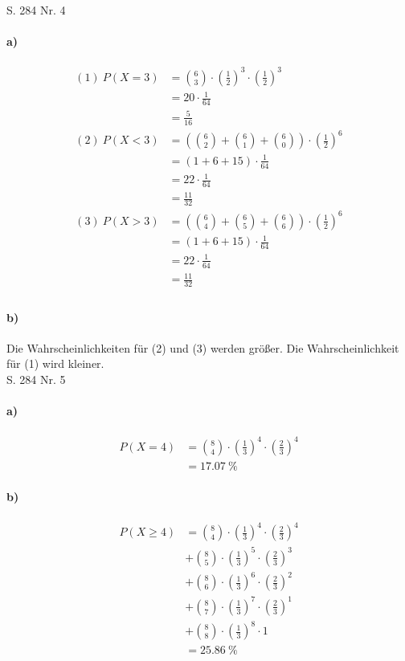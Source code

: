 \documentclass[12pt,a4paper]{report}
\begin{document}
	\noindent
	\Large
	S. 284 Nr. 4
	\large
	\paragraph{a)}
	\begin{align*}
		(1)\ P(X = 3) &= \binom{6}{3} \cdot (\frac{1}{2})^3 \cdot (\frac{1}{2})^3 \\
		&= 20 \cdot \frac{1}{64} \\
		&= \frac{5}{16} \\
		(2)\ P(X < 3) &= (\binom{6}{2} + \binom{6}{1} + \binom{6}{0}) \cdot (\frac{1}{2})^6 \\
		&= (1+6+15) \cdot \frac{1}{64} \\
		&= 22 \cdot \frac{1}{64} \\
		&= \frac{11}{32} \\
		(3)\ P(X > 3) &= (\binom{6}{4} + \binom{6}{5} + \binom{6}{6}) \cdot (\frac{1}{2})^6 \\
		&= (1+6+15) \cdot \frac{1}{64} \\
		&= 22 \cdot \frac{1}{64} \\
		&= \frac{11}{32} \\
	\end{align*}
	\paragraph{b)}
	Die Wahrscheinlichkeiten für (2) und (3) werden größer. Die Wahrscheinlichkeit für (1) wird kleiner.
	\noindent \\[0.75cm]
	\Large
	S. 284 Nr. 5
	\large
	\paragraph{a)}
	\begin{align*}
		P(X = 4) &= \binom{8}{4} \cdot (\frac{1}{3})^4 \cdot (\frac{2}{3})^4 \\
		&= 17.07\ \% 
	\end{align*}
	\paragraph{b)}
	\begin{align*}
		P(X \geq 4) &= \binom{8}{4} \cdot (\frac{1}{3})^4 \cdot (\frac{2}{3})^4 \\
		&+ \binom{8}{5} \cdot (\frac{1}{3})^5 \cdot (\frac{2}{3})^3 \\
		&+ \binom{8}{6} \cdot (\frac{1}{3})^6 \cdot (\frac{2}{3})^2 \\
		&+ \binom{8}{7} \cdot (\frac{1}{3})^7 \cdot (\frac{2}{3})^1 \\
		&+ \binom{8}{8} \cdot (\frac{1}{3})^8 \cdot 1 \\
		&= 25.86\ \%
	\end{align*}
\end{document}
